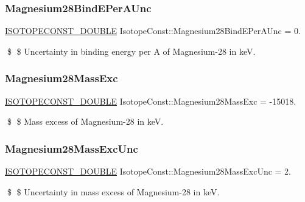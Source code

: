 \subsubsection{\texorpdfstring{Magnesium28\+Bind\+E\+Per\+A\+Unc}{Magnesium28BindEPerAUnc}}
{\footnotesize\ttfamily \mbox{\hyperlink{group___isotope_const-_macros_ga8f45a7272ce02c0b4c65c44636ed719a}{I\+S\+O\+T\+O\+P\+E\+C\+O\+N\+S\+T\+\_\+\+D\+O\+U\+B\+LE}} Isotope\+Const\+::\+Magnesium28\+Bind\+E\+Per\+A\+Unc = 0.}

\$ \$ Uncertainty in binding energy per A of Magnesium-\/28 in keV. \mbox{\label{group___isotope_const-_magnesium-_mg28_gaca5ff20aedca70c32fa7e143a9c74e72}} 
\subsubsection{\texorpdfstring{Magnesium28\+Mass\+Exc}{Magnesium28MassExc}}
{\footnotesize\ttfamily \mbox{\hyperlink{group___isotope_const-_macros_ga8f45a7272ce02c0b4c65c44636ed719a}{I\+S\+O\+T\+O\+P\+E\+C\+O\+N\+S\+T\+\_\+\+D\+O\+U\+B\+LE}} Isotope\+Const\+::\+Magnesium28\+Mass\+Exc = -\/15018.}

\$ \$ Mass excess of Magnesium-\/28 in keV. \mbox{\label{group___isotope_const-_magnesium-_mg28_ga91616139df02720279c804965c74d347}} 
\subsubsection{\texorpdfstring{Magnesium28\+Mass\+Exc\+Unc}{Magnesium28MassExcUnc}}
{\footnotesize\ttfamily \mbox{\hyperlink{group___isotope_const-_macros_ga8f45a7272ce02c0b4c65c44636ed719a}{I\+S\+O\+T\+O\+P\+E\+C\+O\+N\+S\+T\+\_\+\+D\+O\+U\+B\+LE}} Isotope\+Const\+::\+Magnesium28\+Mass\+Exc\+Unc = 2.}

\$ \$ Uncertainty in mass excess of Magnesium-\/28 in keV. \mbox{\label{group___isotope_const-_magnesium-_mg28_ga2a310fce7ba6fbd73db657fc3d57b2d7}} 
